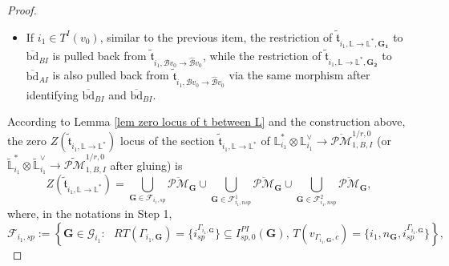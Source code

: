 \documentclass[11pt]{amsart}
\theoremstyle{definition}
\theoremstyle{remark}
\newcommand{\oPMb}{{\overline{\mathcal{PM}}}}
\newcommand{\<}{\left<}
\renewcommand{\>}{\right>}
\numberwithin{equation}{section}
\begin{document}
\begin{proof}
\begin{itemize}
        
      

        \item[-] If $i_1\in T^I(v_{0})$, similar to the previous item, the restriction of $\tilde{\mathfrak{t}}_{i_1,\mathbb L \to \mathbb L^*,\mathbf{G_1}}$ to $\overline{\text{bd}}_{BI}$ is pulled back from  $\tilde{\mathfrak t}_{i_1,{\mathcal B}v_{0}\to\hat{\mathcal B}v_{0}}$, 
         while the restriction of $\tilde{\mathfrak{t}}_{i_1,\mathbb L \to \mathbb L^*,\mathbf{G_2}}$ to $\overline{\text{bd}}_{AI}$  is also pulled back 
         from $\tilde{\mathfrak t}_{i_1,{\mathcal B}v_0\to\hat{\mathcal B}v_0}$ via the same morphism after identifying $\overline{\text{bd}}_{BI}$ and $\overline{\text{bd}}_{BI}$.

        \end{itemize}

        According to Lemma \ref{lem zero locus of t between L} and the construction above, the zero $Z(\tilde{\mathfrak{t}}_{i_1,\mathbb L \to \mathbb L^*})$ locus of the section $\tilde{\mathfrak{t}}_{i_1,\mathbb L \to \mathbb L^*}$ of  ${\mathbb L}^*_{i_1}\otimes {\mathbb L}_{i_1}^\vee\to  \oPMb^{1/r,0}_{1,B,I}$ (or $\widetilde{\mathbb L}^*_{i_1}\otimes \widetilde{\mathbb L}_{i_1}^\vee \to \widetilde{\mathcal{PM}}^{1/r,0}_{1,B,I}$ after gluing) is 
        \begin{equation*}
        Z(\tilde{\mathfrak{t}}_{i_1,\mathbb L \to \mathbb L^*})=\bigcup_{\mathbf{G}\in \bm{\mathcal F}_{i_1,sp}} \oPMb_{\mathbf{G}} \cup \bigcup_{\mathbf{G}\in \bm{\mathcal F}^1_{i_1,nsp}} \oPMb_{\mathbf{G}} \cup \bigcup_{\mathbf{G}\in\bm{\mathcal F}^2_{i_1,nsp}} \oPMb_{\mathbf{G}},
        \end{equation*}
        where, in the notations in Step %
1, 
        \begin{equation*}
            \bm{\mathcal F}_{i_1,sp}:=\left\{ \bm{G}\in \bm{\mathcal G}_{i_1} \colon \text{ $RT(\Gamma_{i_1,\bm{G}})=\{i^{\Gamma_{i_1,\bm{G}}}_{sp}\}\subseteq I^{PI}_{sp,0}(\bm{G})$, $T(v_{\Gamma_{i_1,\bm{G}},c})=\{i_1,n_{\bm{G}},i^{\Gamma_{i_1,\bm{G}}}_{sp}\}$}\right \},
        \end{equation*}
         \begin{equation*}

\end{equation*}
\end{proof}
\end{document}
